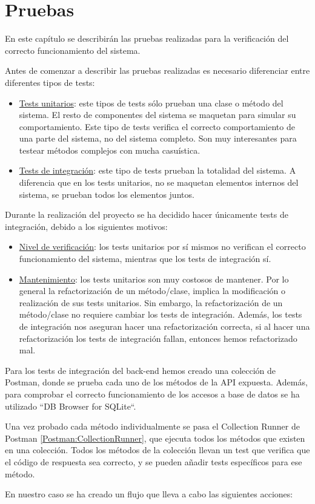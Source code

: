 \chapter{Pruebas}
\label{chap:pruebas}

\label{sect:intropruebas}
En este capítulo se describirán las pruebas realizadas para la verificación del correcto funcionamiento del sistema.

Antes de comenzar a describir las pruebas realizadas es necesario diferenciar entre diferentes tipos de tests:
\begin{itemize}
\item\underline{Tests unitarios}: este tipos de tests sólo prueban una clase o método del sistema. El resto de componentes del sistema se
maquetan para simular su comportamiento. Este tipo de tests verifica el correcto comportamiento de una parte del sistema, no del sistema
completo. Son muy interesantes para testear métodos complejos con mucha casuística.
\item\underline{Tests de integración}: este tipo de tests prueban la totalidad del sistema. A diferencia que en los tests unitarios, no se
maquetan elementos internos del sistema, se prueban todos los elementos juntos.
\end{itemize}

Durante la realización del proyecto se ha decidido hacer únicamente tests de integración, debido a los siguientes motivos:
\begin{itemize}
\item\underline{Nivel de verificación}: los tests unitarios por sí mismos no verifican el correcto funcionamiento del sistema, mientras que los tests de integración sí.
\item\underline{Mantenimiento}: los tests unitarios son muy costosos de mantener. Por lo general la refactorización de un método/clase, implica la 
modificación o realización de sus tests unitarios. Sin embargo, la refactorización de un método/clase no requiere cambiar los tests de integración. Además,
los tests de integración nos aseguran hacer una refactorización correcta, si al hacer una refactorización los tests de integración fallan, entonces hemos 
refactorizado mal. 

\end{itemize}

\label{sect:pruebasback}

Para los tests de integración del back-end hemos creado una colección de Postman, donde se prueba cada uno de los métodos de la API expuesta. Además, para 
comprobar el correcto funcionamiento de los accesos a base de datos se ha utilizado ``DB Browser for SQLite``.
\par
Una vez probado cada método individualmente se pasa el Collection Runner de Postman \ref{Postman:CollectionRunner}, que ejecuta todos los métodos que existen en una colección. Todos los métodos
de la colección llevan un test que verifica que el código de respuesta sea correcto, y se pueden añadir tests específicos para ese método.
\par
En nuestro caso se ha creado un flujo que lleva a cabo las siguientes acciones:

